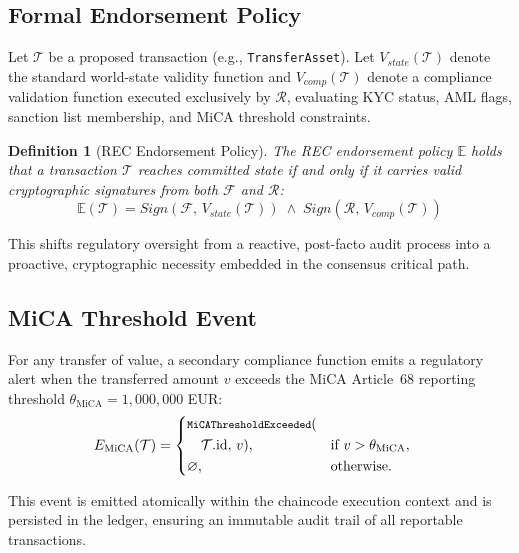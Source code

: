 \documentclass[journal,10pt,twocolumn]{IEEEtran}
\newtheorem{definition}{Definition}
\begin{document}
\subsection{Formal Endorsement Policy}

Let $\mathcal{T}$ be a proposed transaction (e.g., \texttt{TransferAsset}). Let $V_{state}(\mathcal{T})$ denote the standard world-state validity function and $V_{comp}(\mathcal{T})$ denote a compliance validation function executed exclusively by $\mathcal{R}$, evaluating KYC status, AML flags, sanction list membership, and MiCA threshold constraints.

\begin{definition}[REC Endorsement Policy]
\label{def:rec}
The REC endorsement policy $\mathbb{E}$ holds that a transaction $\mathcal{T}$ reaches committed state if and only if it carries valid cryptographic signatures from both $\mathcal{F}$ and $\mathcal{R}$:
\begin{equation*}
\label{eq:endorsement}
\mathbb{E}(\mathcal{T}) = \textit{Sign}(\mathcal{F},\, V_{state}(\mathcal{T})) \;\wedge\; \textit{Sign}(\mathcal{R},\, V_{comp}(\mathcal{T}))
\end{equation*}
\end{definition}

This shifts regulatory oversight from a reactive, post-facto audit process into a proactive, cryptographic necessity embedded in the consensus critical path.

\subsection{MiCA Threshold Event}

For any transfer of value, a secondary compliance function emits a regulatory alert when the transferred amount $v$ exceeds the MiCA Article~68 reporting threshold $\theta_{\text{MiCA}} = 1{,}000{,}000$ EUR:
\[
E_{\text{MiCA}}(\mathcal{T}) =
\left\{
\begin{aligned}
&\text{\ttfamily\footnotesize MiCAThresholdExceeded}(\\
&\quad \mathcal{T}.\mathrm{id},\, v), && \text{if } v > \theta_{\text{MiCA}}, \\
&\varnothing, && \text{otherwise.}
\end{aligned}
\right.
\]

This event is emitted atomically within the chaincode execution context and is persisted in the ledger, ensuring an immutable audit trail of all reportable transactions.
\end{document}
